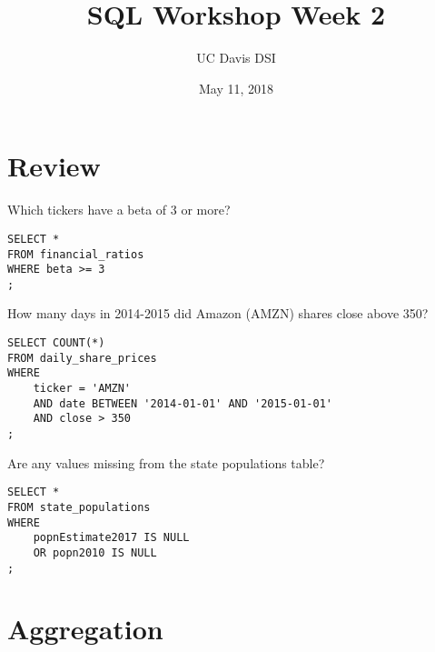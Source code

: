 \documentclass[10pt]{exam}
\begin{document}
 
\title{SQL Workshop Week 2}
\author{UC Davis DSI}
\date{May 11, 2018}

\maketitle

\section{Review}

\begin{questions}

\question Which tickers have a beta of 3 or more?

\begin{solution}
\begin{lstlisting}
SELECT *
FROM financial_ratios
WHERE beta >= 3
;
\end{lstlisting}
\end{solution}


\question How many days in 2014-2015 did Amazon (AMZN) shares close above 350?

\begin{solution}
\begin{lstlisting}
SELECT COUNT(*)
FROM daily_share_prices
WHERE
	ticker = 'AMZN'
	AND date BETWEEN '2014-01-01' AND '2015-01-01'
	AND close > 350
;
\end{lstlisting}
\end{solution}


\question Are any values missing from the state populations table?

\begin{solution}
\begin{lstlisting}
SELECT *
FROM state_populations
WHERE
	popnEstimate2017 IS NULL
	OR popn2010 IS NULL
;
\end{lstlisting}
\end{solution}


\end{questions}


\clearpage

\section{Aggregation}
\end{document}
